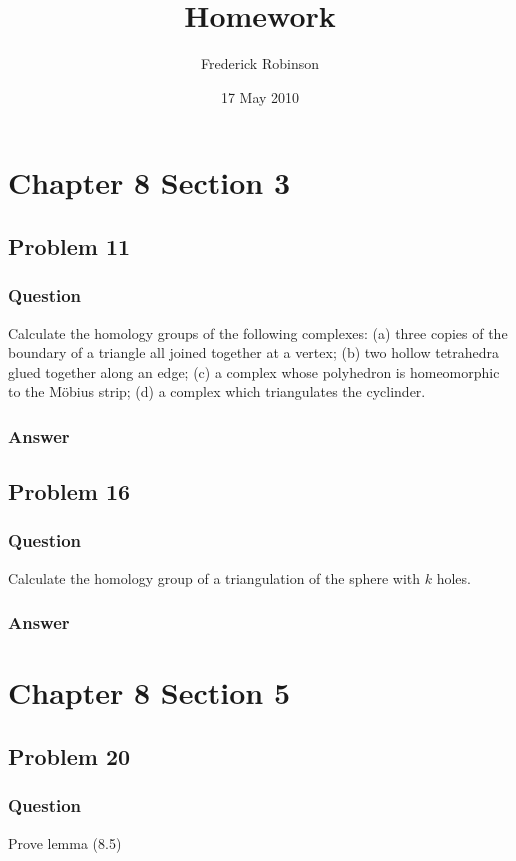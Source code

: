 \documentclass[10pt]{article}
\title{Homework}
\author{Frederick Robinson}
\date{17 May 2010}
\begin{document}

   \maketitle

\section{Chapter 8 Section 3}

\subsection{Problem 11}
\subsubsection{Question}
Calculate the homology groups of the following complexes: (a) three copies of the boundary of a triangle all joined together at a vertex; (b) two hollow tetrahedra glued together along an edge; (c) a complex whose polyhedron is homeomorphic to the M\"obius strip; (d) a complex which triangulates the cyclinder.
\subsubsection{Answer}


\subsection{Problem 16}
\subsubsection{Question}
Calculate the homology group of a triangulation of the sphere with $k$ holes.
\subsubsection{Answer}

\section{Chapter 8 Section 5}

\subsection{Problem 20}
\subsubsection{Question}
Prove lemma (8.5)
\end{document}
